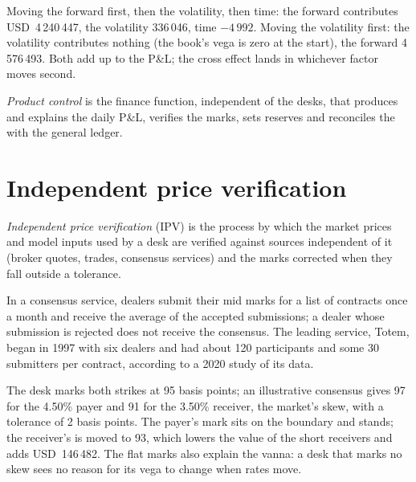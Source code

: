 \begin{example}\label{ex:rc:pnl-explain-and-independent-price-verification:reval}
Moving the forward first, then the volatility, then time: the forward contributes USD~4\,240\,447, the
volatility 336\,046, time $-4\,992$. Moving the volatility first: the volatility contributes nothing (the
book's vega is zero at the start), the forward 4\,576\,493. Both add up to the P\&L; the cross effect
lands in whichever factor moves second.
\end{example}

\begin{definition}\label{def:rc:pnl-explain-and-independent-price-verification:pc}
\emph{Product control} is the finance function, independent of the desks, that
produces and explains the daily P\&L, verifies the marks, sets reserves and reconciles the  with the general ledger.
\end{definition}

\section{Independent price verification}

\begin{definition}\label{def:rc:pnl-explain-and-independent-price-verification:ipv}
\emph{Independent price verification} (IPV) is the process by
which the market prices and model inputs used by a desk are verified against sources independent of
it (broker quotes, trades, consensus services) and the marks corrected when they fall outside a
tolerance.
\end{definition}

In a consensus service, dealers submit their mid marks for a list of contracts once a month and receive
the average of the accepted submissions; a dealer whose submission is rejected does not receive the
consensus. The leading service, Totem, began in 1997 with six dealers and had about 120 participants and some 30
submitters per contract, according to a 2020 study of its data.

\label{lst:rc:pnl-explain-and-independent-price-verification:ipv}

\begin{example}\label{ex:rc:pnl-explain-and-independent-price-verification:ipv}
The desk marks both strikes at 95 basis points; an illustrative consensus gives 97 for the 4.50\% payer
and 91 for the 3.50\% receiver, the market's skew, with a tolerance of 2 basis points. The payer's mark
sits on the boundary and stands; the receiver's is moved to 93, which lowers the value of the short
receivers and adds USD~146\,482. The flat marks also explain the vanna: a desk that marks no skew sees
no reason for its vega to change when rates move.
\end{example}

